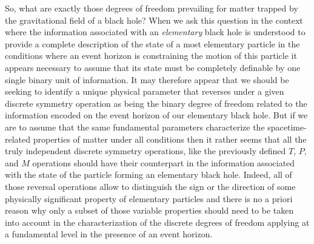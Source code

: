 \documentclass[notitlepage,12pt]{report}
\begin{document}
So, what are exactly those degrees of freedom prevailing for matter trap\-ped by the gravitational field of a black hole? When we ask this question in the context where the information associated with an \textit{elementary} black hole is understood to provide a complete description of the state of a most elementary particle in the conditions where an event horizon is constraining the motion of this particle it appears necessary to assume that its state must be completely definable by one single binary unit of information. It may therefore appear that we should be seeking to identify a unique physical parameter that reverses under a given discrete symmetry operation as being the binary degree of freedom related to the information encoded on the event horizon of our elementary black hole. But if we are to assume that the same fundamental parameters characterize the spacetime-related properties of matter under all conditions then it rather seems that all the truly independent discrete symmetry operations, like the previously defined $T$, $P$, and $M$ operations should have their counterpart in the information associated with the state of the particle forming an elementary black hole. Indeed, all of those reversal operations allow to distinguish the sign or the direction of some physically significant property of elementary particles and there is no a priori reason why only a subset of those variable properties should need to be taken into account in the characterization of the discrete degrees of freedom applying at a fundamental level in the presence of an event horizon.
\end{document}
